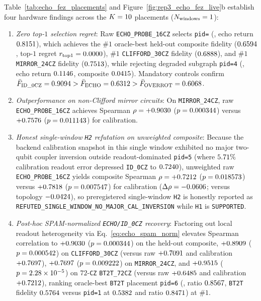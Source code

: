 \documentclass[aps,prx,twocolumn,superscriptaddress,nofootinbib]{revtex4-2}
\begin{document}
Table~\ref{tab:echo_fez_placements} and Figure~\ref{fig:rep3_echo_fez_live}b establish four hardware findings across the $K = 10$ placements ($N_{\mathrm{windows}} = 1$):
\begin{enumerate}
  \item \emph{Zero top-$1$ selection regret}: Raw \texttt{ECHO\_PROBE\_16CZ} selects \texttt{pid=\remEchoTopOnePid} (\remEchoTopOneQubits, echo return $0.8151$), which achieves the $\#1$ oracle-best held-out composite fidelity ($0.6594$, top-$1$ regret $r_{\mathrm{top1}} = 0.0000$), $\#1$ \texttt{CLIFFORD\_30CZ} fidelity ($0.6888$), and $\#1$ \texttt{MIRROR\_24CZ} fidelity ($0.7513$), while rejecting degraded subgraph \texttt{pid=4} (\remEchoWorstQubits, echo return $0.1146$, composite $0.0415$). Mandatory controls confirm $\bar{F}_{\mathrm{ID\_0CZ}} = 0.9094 > \bar{F}_{\mathrm{ECHO}} = 0.6312 > \bar{F}_{\mathrm{OVERROT}} = 0.6068$.
  \item \emph{Outperformance on non-Clifford mirror circuits}: On \texttt{MIRROR\_24CZ}, raw \texttt{ECHO\_PROBE\_16CZ} achieves Spearman $\rho = +0.9030$ ($p = 0.000344$) versus $+0.7576$ ($p = 0.011143$) for calibration.
  \item \emph{Honest single-window \texttt{H2} refutation on unweighted composite}: Because the backend calibration snapshot in this single window exhibited no major two-qubit coupler inversion outside readout-dominated \texttt{pid=5} (where $5.71\%$ calibration readout error depressed \texttt{ID\_0CZ} to $0.7240$), unweighted raw \texttt{ECHO\_PROBE\_16CZ} yields composite Spearman $\rho = +0.7212$ ($p = 0.018573$) versus $+0.7818$ ($p = 0.007547$) for calibration ($\Delta\rho = -0.0606$; versus topology $-0.0424$), so preregistered single-window \texttt{H2} is honestly reported as \texttt{REFUTED\_SINGLE\_WINDOW\_NO\_MAJOR\_CAL\_INVERSION} while \texttt{H1} is \texttt{SUPPORTED}.
  \item \emph{Post-hoc SPAM-normalized \texttt{ECHO/ID\_0CZ} recovery}: Factoring out local readout heterogeneity via Eq.~\eqref{eq:echo_spam_norm} elevates Spearman correlation to $+0.9030$ ($p = 0.000344$) on the held-out composite, $+0.8909$ ($p = 0.000542$) on \texttt{CLIFFORD\_30CZ} (versus raw $+0.7091$ and calibration $+0.7697$), $+0.7697$ ($p = 0.009222$) on \texttt{MIRROR\_24CZ}, and $+0.9515$ ($p = 2.28 \times 10^{-5}$) on $72$-\texttt{CZ} \texttt{BT2T\_72CZ} (versus raw $+0.6485$ and calibration $+0.7212$), ranking oracle-best \texttt{BT2T} placement \texttt{pid=6} (\remEchoBtBestQubits, ratio $0.8567$, \texttt{BT2T} fidelity $0.5764$ versus \texttt{pid=1} at $0.5382$ and ratio $0.8471$) at $\#1$.
\end{enumerate}
\end{document}
